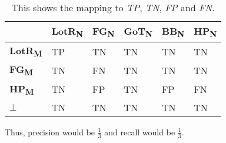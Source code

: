\begin{table}[h]
\centering
\begin{tabular}{l||l|l|l|l|l}
                       & \textbf{LotR\textsubscript{N}} & \textbf{FG\textsubscript{N}} & \textbf{GoT\textsubscript{N}} & \textbf{BB\textsubscript{N}} & \textbf{HP\textsubscript{N}} \\ \hline \hline
\textbf{LotR\textsubscript{M}}  & TP                    & TN                  & TN                   & TN                   & TN                  \\ \hline
\textbf{FG\textsubscript{M}}    & TN                    & FN                  & TN                   & TN                   & TN                  \\ \hline
\textbf{HP\textsubscript{M}}    & TN                    & FP                  & TN                   & FP                   & FN                  \\ \hline
$\mathbf{\bot}$                 & TN                    & TN                  & TN                   & TN                   & TN                  \\
\end{tabular}
\caption{This shows the mapping to \emph{TP}, \emph{TN}, \emph{FP} and \emph{FN}.}
\label{tab_appendix}
\end{table}

Thus, precision would be $\frac{1}{3}$ and recall would be $\frac{1}{3}$.


